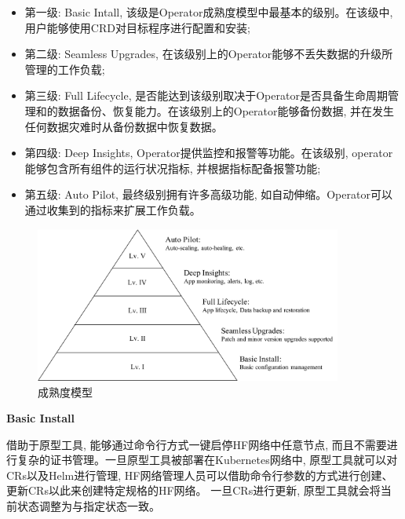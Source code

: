 \begin{itemize}[itemindent=2em]
    \item 第一级: Basic Intall, 该级是Operator成熟度模型中最基本的级别。在该级中, 用户能够使用CRD对目标程序进行配置和安装;

    \item 第二级: Seamless Upgrades, 在该级别上的Operator能够不丢失数据的升级所管理的工作负载;

    \item 第三级: Full Lifecycle, 是否能达到该级别取决于Operator是否具备生命周期管理和的数据备份、恢复能力。在该级别上的Operator能够备份数据, 并在发生任何数据灾难时从备份数据中恢复数据。

    \item 第四级: Deep Insights, Operator提供监控和报警等功能。在该级别, operator能够包含所有组件的运行状况指标, 并根据指标配备报警功能;

    \item 第五级: Auto Pilot, 最终级别拥有许多高级功能, 如自动伸缩。Operator可以通过收集到的指标来扩展工作负载。

\end{itemize}

\begin{figure}[h] %
    \centering %
    \includegraphics[width=0.9\textwidth]{FIGs/chapter5/maturity.pdf} %
    \caption{成熟度模型} %
    \label{maturity} %
\end{figure}%

\textbf{Basic Install}

借助于原型工具, 能够通过命令行方式一键启停HF网络中任意节点, 而且不需要进行复杂的证书管理。一旦原型工具被部署在Kubernetes网络中, 原型工具就可以对CRs以及Helm进行管理, HF网络管理人员可以借助命令行参数的方式进行创建、更新CRs以此来创建特定规格的HF网络。 一旦CRs进行更新, 原型工具就会将当前状态调整为与指定状态一致。

